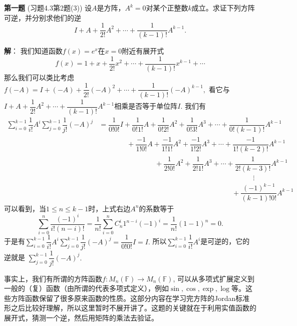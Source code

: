 
\date{2022-11-18 第六次习题课}
\author{}



\maketitle

\ifLargeLayout
\larger[2]
\fi

{\bf 第一题} (习题4.3第2题(3)) 设$A$是方阵，$A^k = 0$对某个正整数$k$成立。求证下列方阵可逆，并分别求他们的逆
$$I + A + \dfrac{1}{2!}A^2 + \cdots + \dfrac{1}{(k-1)!}A^{k-1}.$$

\ifIncludeAnswer

\newpageorvspace

{\bf 解}： 我们知道函数$f(x) = e^x$在$x = 0$附近有展开式
$$f(x) = 1 + x + \dfrac{1}{2!}x^2 + \cdots + \dfrac{1}{(k-1)!}x^{k-1} + \cdots$$
那么我们可以类比考虑$f(-A) = I + (-A) + \dfrac{1}{2!}(-A)^2 + \cdots + \dfrac{1}{(k-1)!}(-A)^{k-1},$ 看它与$I + A + \dfrac{1}{2!}A^2 + \cdots + \dfrac{1}{(k-1)!}A^{k-1}$相乘是否等于单位阵$I.$ 我们有
\begin{align*}
\sum\limits_{i=0}^{k-1} \dfrac{1}{i!} A^i \sum\limits_{j=0}^{k-1} \dfrac{1}{j!} (-A)^j & = \dfrac{1}{0!0!} I + \dfrac{1}{0!1!} A + \dfrac{1}{0!2!} A^2 + \dfrac{1}{0!3!} A^3 + \cdots + \dfrac{1}{0!(k-1)!} A^{k-1} \\
& \hspace{4em} + \dfrac{-1}{1!0!} A + \dfrac{-1}{1!1!} A^2 + \dfrac{-1}{1!2!} A^3 + \cdots + \dfrac{-1}{1!(k-2)!} A^{k-1} \\
& \hspace{8em} + \dfrac{1}{2!0!} A^2 + \dfrac{1}{2!1!} A^3 + \cdots + \dfrac{1}{2!(k-3)!} A^{k-1} \\
& \hspace{22em} \vdots \\
& \hspace{19em} + \dfrac{(-1)^{k-1}}{(k-1)!0!} A^{k-1}
\end{align*}
可以看到，当$1\leqslant n \leqslant k-1$时，上式右边$A^n$的系数等于
$$\sum\limits_{i=0}^n \dfrac{(-1)^i}{i!(n-i)!} = \dfrac{1}{n!} \sum\limits_{i=0}^n C_n^i 1^{n-i} (-1)^i = \dfrac{1}{n!} (1-1)^n = 0.$$
于是有$\sum\limits_{i=0}^{k-1} \dfrac{1}{i!} A^i \sum\limits_{j=0}^{k-1} \dfrac{1}{j!} (-A)^j = \dfrac{1}{0!0!} I = I.$ 所以$\sum\limits_{i=0}^{k-1} \dfrac{1}{i!} A^i$是可逆的，它的逆就是 $\sum\limits_{j=0}^{k-1} \dfrac{1}{j!} (-A)^j.$

事实上，我们有所谓的方阵函数$f: M_n(\mathbb{F}) \to M_n(\mathbb{F})$, 可以从多项式扩展定义到一般的（复）函数（由所谓的代表多项式定义），例如$\sin, \cos, \exp, \log$等。这些方阵函数保留了很多原来函数的性质。这部分内容在学习完方阵的Jordan标准形之后比较好理解，所以这里暂时不展开讲了。这题的关键就在于利用实值函数的展开式，猜测一个逆，然后用矩阵的乘法去验证。

